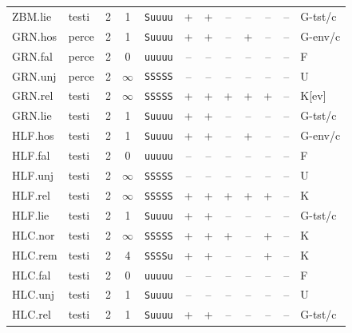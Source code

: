 {\begin{longtable}{@{}llcccccccccl@{}}
ZBM.lie & testi & 2 & 1 & \texttt{Suuuu} & \textsf{+} & \textsf{+} & \textsf{--} & \textsf{--} & \textsf{--} & -- & G-tst/c \\
GRN.hos & perce & 2 & 1 & \texttt{Suuuu} & \textsf{+} & \textsf{+} & \textsf{--} & \textsf{+} & \textsf{--} & -- & G-env/c \\
GRN.fal & perce & 2 & 0 & \texttt{uuuuu} & \textsf{--} & \textsf{--} & \textsf{--} & \textsf{--} & \textsf{--} & -- & F \\
GRN.unj & perce & 2 & $\infty$ & \texttt{SSSSS} & \textsf{--} & \textsf{--} & \textsf{--} & \textsf{--} & \textsf{--} & -- & U \\
GRN.rel & testi & 2 & $\infty$ & \texttt{SSSSS} & \textsf{+} & \textsf{+} & \textsf{+} & \textsf{+} & \textsf{+} & -- & K[ev] \\
GRN.lie & testi & 2 & 1 & \texttt{Suuuu} & \textsf{+} & \textsf{+} & \textsf{--} & \textsf{--} & \textsf{--} & -- & G-tst/c \\
HLF.hos & testi & 2 & 1 & \texttt{Suuuu} & \textsf{+} & \textsf{+} & \textsf{--} & \textsf{+} & \textsf{--} & -- & G-env/c \\
HLF.fal & testi & 2 & 0 & \texttt{uuuuu} & \textsf{--} & \textsf{--} & \textsf{--} & \textsf{--} & \textsf{--} & -- & F \\
HLF.unj & testi & 2 & $\infty$ & \texttt{SSSSS} & \textsf{--} & \textsf{--} & \textsf{--} & \textsf{--} & \textsf{--} & -- & U \\
HLF.rel & testi & 2 & $\infty$ & \texttt{SSSSS} & \textsf{+} & \textsf{+} & \textsf{+} & \textsf{+} & \textsf{+} & -- & K \\
HLF.lie & testi & 2 & 1 & \texttt{Suuuu} & \textsf{+} & \textsf{+} & \textsf{--} & \textsf{--} & \textsf{--} & -- & G-tst/c \\
HLC.nor & testi & 2 & $\infty$ & \texttt{SSSSS} & \textsf{+} & \textsf{+} & \textsf{+} & \textsf{--} & \textsf{+} & -- & K \\
HLC.rem & testi & 2 & 4 & \texttt{SSSSu} & \textsf{+} & \textsf{+} & \textsf{--} & \textsf{--} & \textsf{+} & -- & K \\
HLC.fal & testi & 2 & 0 & \texttt{uuuuu} & \textsf{--} & \textsf{--} & \textsf{--} & \textsf{--} & \textsf{--} & -- & F \\
HLC.unj & testi & 2 & 1 & \texttt{Suuuu} & \textsf{--} & \textsf{--} & \textsf{--} & \textsf{--} & \textsf{--} & -- & U \\
HLC.rel & testi & 2 & 1 & \texttt{Suuuu} & \textsf{+} & \textsf{+} & \textsf{--} & \textsf{--} & \textsf{--} & -- & G-tst/c \\

\end{longtable}}
